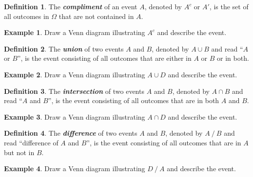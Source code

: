 \documentclass[
  11pt,
]{book}
\theoremstyle{definition}
\newtheorem{definition}{Definition}[chapter]
\theoremstyle{definition}
\newtheorem{example}{Example}[chapter]
\theoremstyle{definition}
\theoremstyle{definition}
\theoremstyle{remark}
\begin{document}
\begin{definition}
The \textbf{\emph{compliment}} of an event \(A\), denoted by \(A^c\) or \(A'\), is the set of all outcomes in \(\Omega\) that are not contained in \(A\).
\end{definition}

\begin{example}
Draw a Venn diagram illustrating \(A^c\) and describe the event.
\end{example}

\hfill\break
\hfill\break
\hfill\break
\hfill\break
\hfill\break

\begin{definition}
The \textbf{\emph{union}} of two events \(A\) and \(B\), denoted by \(A \cup B\) and read ``\(A\) or \(B\)'', is the event consisting of all outcomes that are either in \(A\) or \(B\) or in both.
\end{definition}

\begin{example}
Draw a Venn diagram illustrating \(A \cup D\) and describe the event.
\end{example}

\hfill\break
\hfill\break
\hfill\break
\hfill\break
\hfill\break

\begin{definition}
The \textbf{\emph{intersection}} of two events \(A\) and \(B\), denoted by \(A \cap B\) and read ``\(A\) and \(B\)'', is the event consisting of all outcomes that are in both \(A\) and \(B\).
\end{definition}

\begin{example}
Draw a Venn diagram illustrating \(A \cap D\) and describe the event.
\end{example}

\hfill\break
\hfill\break
\hfill\break
\hfill\break
\hfill\break

\begin{definition}
The \textbf{\emph{difference}} of two events \(A\) and \(B\), denoted by \(A \mathbin{/} B\) and read ``difference of \(A\) and \(B\)'', is
the event consisting of all outcomes that are in \(A\) but not in \(B\).
\end{definition}

\begin{example}
Draw a Venn diagram illustrating \(D \mathbin{/} A\) and describe the event.
\end{example}

\hfill\break
\hfill\break
\hfill\break
\hfill\break
\hfill\break
\end{document}
